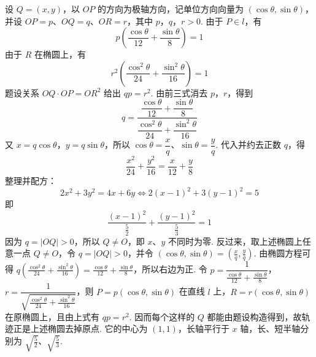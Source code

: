 \documentclass[UTF8,a4paper,oneside,11pt]{ctexbook}
\begin{document}
\begin{solution}
设 \(Q=(x,y)\)，以 \(OP\) 的方向为极轴方向，记单位方向向量为 \((\cos\theta,\sin\theta)\)，并设 \(OP=p\)、\(OQ=q\)、\(OR=r\)，其中 \(p\)，\(q\)，\(r>0\). 由于 \(P\in l\)，有
\[
p\left(\frac{\cos\theta}{12}+\frac{\sin\theta}{8}\right)=1
\]
由于 \(R\) 在椭圆上，有
\[
r^2\left(\frac{\cos^2\theta}{24}+\frac{\sin^2\theta}{16}\right)=1
\]
题设关系 \(OQ\cdot OP=OR^2\) 给出 \(q p=r^2\). 由前三式消去 \(p\)，\(r\)，得到
\[
q=\frac{\dfrac{\cos\theta}{12}+\dfrac{\sin\theta}{8}}
{\dfrac{\cos^2\theta}{24}+\dfrac{\sin^2\theta}{16}}
\]
又 \(x=q\cos\theta\)，\(y=q\sin\theta\)，所以 \(\cos\theta=\dfrac{x}{q}\)、\(\sin\theta=\dfrac{y}{q}\). 代入并约去正数 \(q\)，得
\[
\frac{x^2}{24}+\frac{y^2}{16}=\frac{x}{12}+\frac{y}{8}
\]
整理并配方：
\[
2x^2+3y^2=4x+6y
\Longleftrightarrow 2(x-1)^2+3(y-1)^2=5
\]
即
\[
\frac{(x-1)^2}{\frac52}+\frac{(y-1)^2}{\frac53}=1
\]
因为 \(q=|OQ|>0\)，所以 \(Q\ne O\)，即 \(x\)、\(y\) 不同时为零. 反过来，取上述椭圆上任意一点 \(Q\ne O\)，令 \(q=|OQ|>0\)，并令 \((\cos\theta,\sin\theta)=(\frac{x}{q},\frac{y}{q})\). 由椭圆方程可得 \(q\left(\frac{\cos^2\theta}{24}+\frac{\sin^2\theta}{16}\right)=\frac{\cos\theta}{12}+\frac{\sin\theta}{8}\)，所以右边为正. 令 \(p=\dfrac{1}{\frac{\cos\theta}{12}+\frac{\sin\theta}{8}}\)，\(r=\dfrac{1}{\sqrt{\frac{\cos^2\theta}{24}+\frac{\sin^2\theta}{16}}}\)，则 \(P=p(\cos\theta,\sin\theta)\) 在直线 \(l\) 上，\(R=r(\cos\theta,\sin\theta)\) 在原椭圆上，且由上式有 \(qp=r^2\). 因而每个这样的 \(Q\) 都能由题设构造得到，故轨迹正是上述椭圆去掉原点. 它的中心为 \((1,1)\)，长轴平行于 \(x\) 轴，长、短半轴分别为 \(\sqrt{\frac52}\)、\(\sqrt{\frac53}\).
\end{solution}

\end{document}
